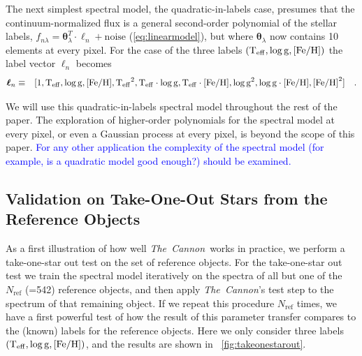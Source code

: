 \documentclass[12pt, preprint]{aastex}
\newcommand{\tc}{\textsl{The~Cannon}}
\newcommand{\set}[1]{\bm{#1}}
\newcommand{\starlabel}{\ell}
\newcommand{\starlabelvec}{\set{\starlabel}}
\newcommand{\teff}{\mbox{$\rm T_{eff}$}}
\newcommand{\feh}{\mbox{$\rm [Fe/H]$}}
\newcommand{\logg}{\mbox{$\rm \log g$}}
\newcommand{\rfn}{\mathrm{ref}}
\begin{document}
The next simplest spectral model, the quadratic-in-labels case,
 presumes that the continuum-normalized flux is a general second-order polynomial of the stellar labels, $f_{n\lambda} =
\set{\theta}_\lambda^T \cdot \starlabelvec_n + \mbox{noise}$ 
(\ref{eq:linearmodel}), 
but where $\set{\theta}_\lambda$ now contains 10 elements at every pixel.
For the case of the three labels $(\teff , \logg , \feh)$ the label vector $\starlabelvec_n$
becomes  
\begin{eqnarray}
\starlabelvec_n &\equiv&
[1, \teff, \logg, \feh, \teff^2, \teff\cdot\logg, \teff\cdot\feh, \logg^2, \logg\cdot\feh, \feh^2]
 \label{eq:quadinthreelabels}\quad.
\end{eqnarray}


We will use this quadratic-in-labels spectral model throughout the rest of the paper.  The exploration of higher-order polynomials for the spectral model at every pixel, or even a Gaussian process at every pixel, is beyond the scope of this paper. 
\textcolor{blue}{For any other application the complexity of the spectral model (for example, is a quadratic model good enough?) should be examined.}
 
\subsection{Validation on Take-One-Out Stars from the Reference Objects}
\label{sec:take-one-out}

As a first illustration of how well \tc\ works in practice, we perform a take-one-star out test on the set of reference objects.
For the take-one-star out test we train the spectral model iteratively on the spectra of all but one of the $N_\rfn$ (=542) 
reference objects, and then apply \tc 's test step to the spectrum of that remaining object. If we repeat this procedure $N_\rfn$ times, 
we have a first powerful test of how the result of this parameter transfer compares to the (known) labels for the reference objects.
 Here we only consider three labels $(\teff , \logg , \feh)$, and the results are shown in \figurename~\ref{fig:takeonestarout}.
\end{document}
